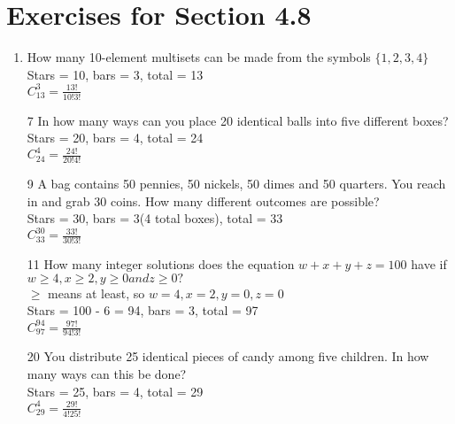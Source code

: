 \documentclass[12pt]{article}
\begin{document}
\section*{Exercises for Section 4.8}
\begin{enumerate}
    \item How many 10-element multisets can be made from the symbols $\{1,2,3,4\}$\\
	Stars = 10, bars = 3, total = 13\\
	\textbf{$C_{13}^3 = \frac{13!}{10!3!}$}
    \item [7] In how many ways can you place 20 identical balls into five different boxes?\\
	Stars = 20, bars = 4, total = 24\\
	\textbf{$C_{24}^4 = \frac{24!}{20!4!}$}
    \item [9] A bag contains 50 pennies, 50 nickels, 50 dimes and 50 quarters. You reach in and grab 30 coins. How many different outcomes are possible?\\
	Stars = 30, bars = 3(4 total boxes), total = 33\\
	\textbf{$C_{33}^{30} = \frac{33!}{30!3!}$}
    \item [11] How many integer solutions does the equation $w+ x + y+ z = 100$ have if $w \ge 4, x \ge 2, y \ge 0 and z \ge 0?$\\
	$\ge$ means at least, so $w=4, x=2, y=0, z=0$\\
	Stars = 100 - 6 = 94, bars = 3, total = 97\\
	\textbf{$C_{97}^{94} = \frac{97!}{94!3!}$}
    \item [20] You distribute 25 identical pieces of candy among five children. In how many ways can this be done?\\
	Stars = 25, bars = 4, total = 29\\
	\textbf{}$C_{29}^4 = \frac{29!}{4!25!}$
\end{enumerate}
\end{document}
